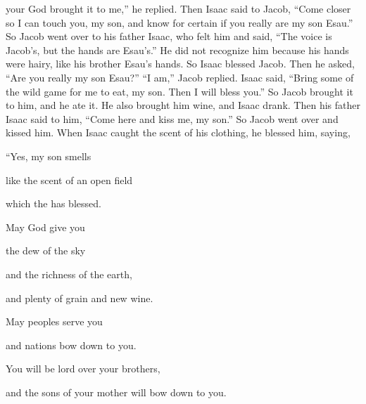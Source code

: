 {your God
brought
it to me,”
he replied.
Then Isaac
said
to Jacob,
“Come closer
so I can
touch
you, my son,
and know for certain if
you really
are my son
Esau.”
So
Jacob
went over to
his father
Isaac,
who felt
him and said,
“The voice
is Jacob’s,
but the hands
are Esau’s.”
He did not
recognize
him because
his hands
were hairy,
like his brother
Esau’s
hands.
So Isaac blessed Jacob.
Then he asked,
“Are you
really
my son
Esau?” “I am,”
Jacob replied.
Isaac said,
“Bring some of the wild game
for me to eat,
my son.
Then
I will
bless
you.” So Jacob brought it to him, and he ate
it. He also brought
him wine,
and Isaac drank.
Then his father
Isaac
said
to him, “Come here
and kiss
me, my son.”
So Jacob went over
and kissed
him. When Isaac caught the scent
of his clothing,
he blessed
him, saying,
\par }{\Q “Yes,
my son
smells
\par }{\Q like the scent
of an open field
\par }{\Q which
the {}
has blessed.
\par }{\Q {}May God
give
you
\par }{\Q the dew
of the sky
\par }{\Q and the richness
of the earth,
\par }{\Q and plenty
of grain
and new wine.
\par }{\Q {}May peoples
serve
you
\par }{\Q and nations
bow
down to you.
\par }{\Q You will be
lord
over your brothers,
\par }{\Q and the sons
of your mother
will bow down
to you.

}
